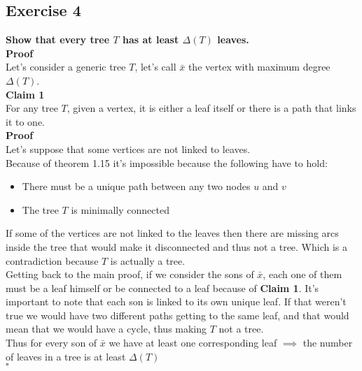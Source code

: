 \subsection*{Exercise 4}
\boldmath
\textbf{Show that every tree $T$ has at least $\Delta(T)$ leaves.}\\
\unboldmath
\linebreak
\textbf{Proof}\\
Let's consider a generic tree $T$, let's call $\bar{x}$ the vertex with maximum degree $\Delta(T)$.\\
\linebreak
\textbf{Claim 1}\\
For any tree $T$, given a vertex, it is either a leaf itself or there is a path that links it to one.\\
\linebreak
\textbf{Proof}\\
Let's suppose that some vertices are not linked to leaves.\\
Because of theorem 1.15 it's impossible because the following have to hold:
\begin{itemize}
    \item There must be a unique path between any two nodes $u$ and $v$
    \item The tree $T$ is minimally connected
\end{itemize}
If some of the vertices are not linked to the leaves then there are missing arcs inside the tree that would make it disconnected and thus not a tree. Which is a contradiction because $T$ is actually a tree.\\
\linebreak
Getting back to the main proof, if we consider the sons of $\bar{x}$, each one of them must be a leaf himself or be connected to a leaf because of \textbf{Claim 1}. It's important to note that each son is linked to its own unique leaf. If that weren't true we would have two different paths getting to the same leaf, and that would mean that we would have a cycle, thus making $T$ not a tree.\\
Thus for every son of $\bar{x}$ we have at least one corresponding leaf $\implies$ the number of leaves in a tree is at least $\Delta(T)$\\
\vspace{5pt}\hspace{2cm}$\square$
